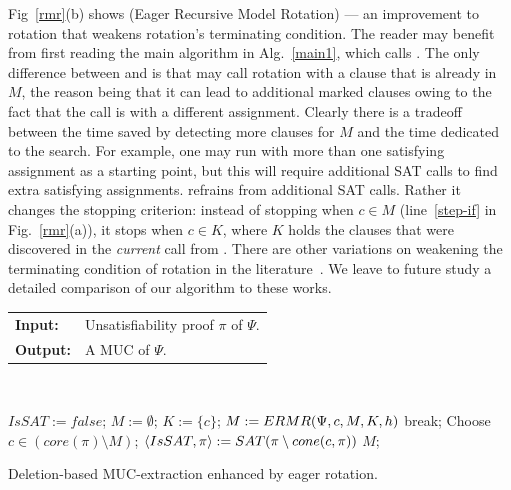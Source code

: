 \documentclass[twoside,11pt]{article}
\renewcommand\Pr{\pi}
\begin{document}
Fig~\ref{rmr}(b) shows  (Eager Recursive Model Rotation) --- an
improvement to rotation that weakens rotation's terminating condition. The
reader may benefit from first reading the main algorithm in
Alg.~\ref{main1}, which calls . The only difference between
 and  is that  may call rotation with a clause
that is already in $M$, the reason being that it can lead to additional
marked clauses owing to the fact that the call is with a different
assignment. Clearly there is a tradeoff between the time saved by detecting
more clauses for $M$ and the time dedicated to the search. For example, one
may run  with more than one satisfying assignment as a starting
point, but this will require additional SAT calls to find extra satisfying
assignments.  refrains from additional SAT calls. Rather it changes
the stopping criterion: instead of stopping when $c \in M$
(line~\ref{step-if} in Fig.~\ref{rmr}(a)), it stops when $c \in K$, where $K$
holds the clauses that were discovered in the \emph{current} call from
. There are other variations on weakening the terminating condition
of rotation in the
literature~\cite{DBLP:journals/aicom/BelovLM12,DBLP:conf/cp/Wieringa12}. We
leave to future study a detailed comparison of our algorithm to these works.

\begin{algorithm}
\begin{tabular}{lp{8.5 cm}}
{\bf Input:}  & Unsatisfiability proof $\Pr$ of $\Psi$.\\
{\bf Output:} & A MUC of $\Psi$. \\
\end{tabular} \\
\vspace {0.3 cm}
\begin{algorithmic}[1]
\State $IsSAT := false$;
\State $M := \emptyset$;
\State \label{step-K}$K := \{c\}$;
\State \label{step-call}$M := {\sc ERMR} (\Psi, c, M, K, h)$ 
\EndIf
\If {$core(\Pr) = M$} break; \EndIf
\State Choose $c \in (core(\Pr) \setminus M)$;
\State $\langle IsSAT, \Pr \rangle := \alg{SAT} (\Pr \setminus  cone(c,\Pr))$ \Comment{$cone(c,\Pr)$ is the cone of $c$ in $\Pr$}
\EndWhile
\State \Return $M$;

\end{algorithmic}
\caption{Deletion-based MUC-extraction enhanced by eager rotation. } \label{main1}

\end{algorithm}
\end{document}
